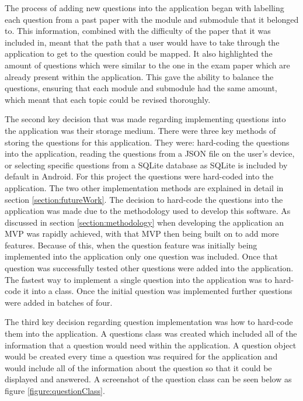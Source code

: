 \documentclass{article}
\begin{document}
The process of adding new questions into the application began with labelling each question from a past paper with the module and submodule that it belonged to. This information, combined with the difficulty of the paper that it was included in, meant that the path that a user would have to take through the application to get to the question could be mapped. It also highlighted the amount of questions which were similar to the one in the exam paper which are already present within the application. This gave the ability to balance the questions, ensuring that each module and submodule had the same amount, which meant that each topic could be revised thoroughly. \par

The second key decision that was made regarding implementing questions into the application was their storage medium. There were three key methods of storing the questions for this application. They were: hard-coding the questions into the application, reading the questions from a JSON file on the user's device, or selecting specific questions from a SQLite database as SQLite is included by default in Android. For this project the questions were hard-coded into the application. The two other implementation methods are explained in detail in section \ref{section:futureWork}. The decision to hard-code the questions into the application was made due to the methodology used to develop this software. As discussed in section \ref{section:methodology} when developing the application an MVP was rapidly achieved, with that MVP then being built on to add more features. Because of this, when the question feature was initially being implemented into the application only one question was included. Once that question was successfully tested other questions were added into the application. The fastest way to implement a single question into the application was to hard-code it into a class. Once the initial question was implemented further questions were added in batches of four. \par

The third key decision regarding question implementation was how to hard-code them into the application. A questions class was created which included all of the information that a question would need within the application. A question object would be created every time a question was required for the application and would include all of the information about the question so that it could be displayed and answered. A screenshot of the question class can be seen below as figure \ref{figure:questionClass}. 
\end{document}
